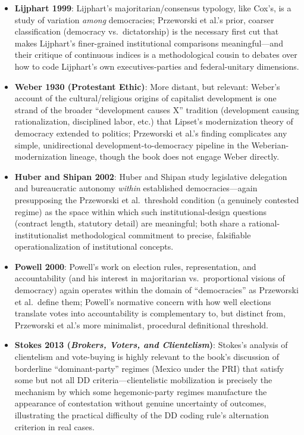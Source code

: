 \documentclass[12pt]{article}
\begin{document}
\begin{itemize}[leftmargin=*, itemsep=4pt]
    \item \textbf{Lijphart 1999}: Lijphart's majoritarian/consensus typology, like Cox's, is a study of variation \textit{among} democracies; Przeworski et al.'s prior, coarser classification (democracy vs.\ dictatorship) is the necessary first cut that makes Lijphart's finer-grained institutional comparisons meaningful---and their critique of continuous indices is a methodological cousin to debates over how to code Lijphart's own executives-parties and federal-unitary dimensions.
    \item \textbf{Weber 1930 (Protestant Ethic)}: More distant, but relevant: Weber's account of the cultural/religious origins of capitalist development is one strand of the broader ``development causes X'' tradition (development causing rationalization, disciplined labor, etc.) that Lipset's modernization theory of democracy extended to politics; Przeworski et al.'s finding complicates any simple, unidirectional development-to-democracy pipeline in the Weberian-modernization lineage, though the book does not engage Weber directly.
    \item \textbf{Huber and Shipan 2002}: Huber and Shipan study legislative delegation and bureaucratic autonomy \textit{within} established democracies---again presupposing the Przeworski et al.\ threshold condition (a genuinely contested regime) as the space within which such institutional-design questions (contract length, statutory detail) are meaningful; both share a rational-institutionalist methodological commitment to precise, falsifiable operationalization of institutional concepts.
    \item \textbf{Powell 2000}: Powell's work on election rules, representation, and accountability (and his interest in majoritarian vs.\ proportional visions of democracy) again operates within the domain of ``democracies'' as Przeworski et al.\ define them; Powell's normative concern with how well elections translate votes into accountability is complementary to, but distinct from, Przeworski et al.'s more minimalist, procedural definitional threshold.
    \item \textbf{Stokes 2013 (\textit{Brokers, Voters, and Clientelism})}: Stokes's analysis of clientelism and vote-buying is highly relevant to the book's discussion of borderline ``dominant-party'' regimes (Mexico under the PRI) that satisfy some but not all DD criteria---clientelistic mobilization is precisely the mechanism by which some hegemonic-party regimes manufacture the appearance of contestation without genuine uncertainty of outcomes, illustrating the practical difficulty of the DD coding rule's alternation criterion in real cases.

\end{itemize}
\end{document}
